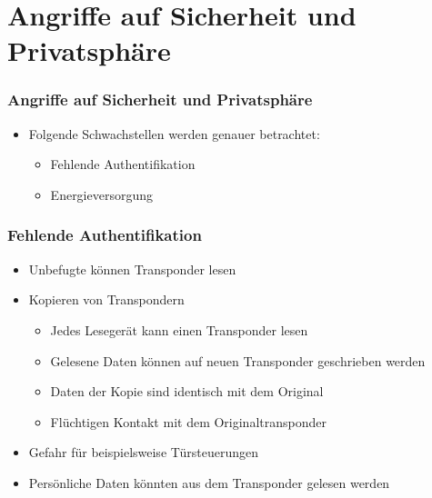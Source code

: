 \documentclass{beamer}
\begin{document}
\section{Angriffe auf Sicherheit und Privatsphäre}
\begin{frame}
\frametitle{Angriffe auf Sicherheit und Privatsphäre}

\begin{itemize}
	\item Folgende Schwachstellen werden genauer betrachtet:
	\begin{itemize}
		\item Fehlende Authentifikation
		\item Energieversorgung
	\end{itemize}
\end{itemize}
\end{frame}


\begin{frame}
\frametitle{Fehlende Authentifikation}

\begin{itemize}
	\item Unbefugte können Transponder lesen
	\item Kopieren von Transpondern
	\begin{itemize}
		\item Jedes Lesegerät kann einen Transponder lesen
		\item Gelesene Daten können auf neuen Transponder geschrieben werden
		\item Daten der Kopie sind identisch mit dem Original
		\item Flüchtigen Kontakt mit dem Originaltransponder 
	\end{itemize}
	\item Gefahr für beispielsweise Türsteuerungen
	\item Persönliche Daten könnten aus dem Transponder gelesen werden
\end{itemize}
\end{frame}
\end{document}
